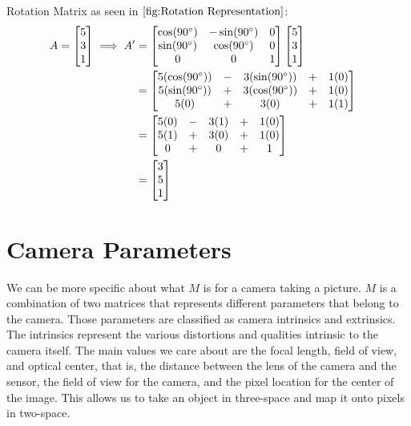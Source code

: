 \documentclass[
    12pt,
    twoside,
    bibstyle=chicago,
    headerstyle=uppercase,
	bibfile=thesis.bib
]{reedthesis}
\begin{document}
Rotation Matrix as seen in $\ref{fig:Rotation Representation}$:
\begin{align*}	
A = \begin{bmatrix}5\\3\\1\end{bmatrix} \implies A' &= 
\begin{bmatrix}\cos(90\degree)&-\sin(90\degree)&0\\\sin(90\degree)&\cos(90\degree)&0\\0&0&1\end{bmatrix}
\begin{bmatrix}5\\3\\1\end{bmatrix}\\ &= 
\begin{bmatrix}5(\cos(90\degree)) &-& 3(\sin(90\degree)) &+& 1(0)\\5(\sin(90\degree)) &+& 3(\cos(90\degree)) &+& 1(0)\\5(0) &+& 3(0) &+& 1(1)\end{bmatrix}&\\ &=
\begin{bmatrix}5(0) &-& 3(1) &+& 1(0)\\5(1) &+& 3(0) &+& 1(0)\\0 &+& 0 &+& 1\end{bmatrix}\\ &= \begin{bmatrix}3\\5\\1\end{bmatrix}
\end{align*}

\section{Camera Parameters}

We can be more specific about what $M$ is for a camera taking a picture. $M$ is a combination of two matrices that represents different parameters that belong to the camera. Those parameters are classified as camera intrinsics and extrinsics. The intrinsics represent the various distortions and qualities intrinsic to the camera itself. The main values we care about are the focal length, field of view, and optical center, that is, the distance between the lens of the camera and the sensor, the field of view for the camera, and the pixel location for the center of the image. This allows us to take an object in three-space and map it onto pixels in two-space. 
\end{document}

